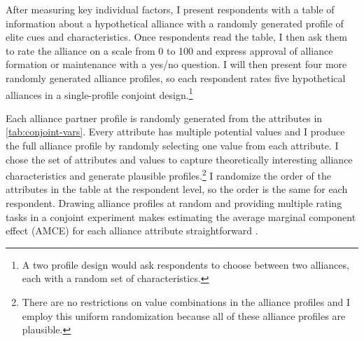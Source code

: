 \documentclass[12pt]{article}
\begin{document}
After measuring key individual factors, I present respondents with a table of information about a hypothetical alliance with a randomly generated profile of elite cues and characteristics.
Once respondents read the table, I then ask them to rate the alliance on a scale from 0 to 100 and express approval of alliance formation or maintenance with a yes/no question. 
I will then present four more randomly generated alliance profiles, so each respondent rates five hypothetical alliances in a single-profile conjoint design.\footnote{A two profile design would ask respondents to choose between two alliances, each with a random set of characteristics.} 


Each alliance partner profile is randomly generated from the attributes in \autoref{tab:conjoint-vars}.
Every attribute has multiple potential values and I produce the full alliance profile by randomly selecting one value from each attribute. 
I chose the set of attributes and values to capture theoretically interesting alliance characteristics and generate plausible profiles.\footnote{There are no restrictions on value combinations in the alliance profiles and I employ this uniform randomization because all of these alliance profiles are plausible.} %
I randomize the order of the attributes in the table at the respondent level, so the order is the same for each respondent. 
Drawing alliance profiles at random and providing multiple rating tasks in a conjoint experiment makes estimating the average marginal component effect (AMCE) for each alliance attribute straightforward \citep{Hainmuelleretal2014}. 
\end{document}
